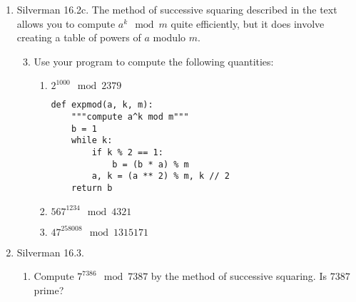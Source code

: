 \documentclass[10pt,twoside]{article}
\begin{document}
\begin{enumerate}[itemsep=2em,label=\Alph*.]
\begin{enumerate}[label=(\alph*)]
        \end{enumerate}
    \item Silverman 16.2c. The method of successive squaring described in the text allows you to compute $a^k \mod{m}$ quite efficiently, but it does involve creating a table of powers of $a$ modulo $m$.
            \begin{enumerate}[label=(\alph*)]
                \setcounter{enumii}{2}
            \item Use your program to compute the following quantities:
                \begin{enumerate}[label=(\roman*)]
                    \item $2^{1000} \mod{2379}$

                    \begin{lstlisting}
def expmod(a, k, m):
    """compute a^k mod m"""
    b = 1
    while k:
        if k % 2 == 1:
            b = (b * a) % m
        a, k = (a ** 2) % m, k // 2
    return b
    \end{lstlisting}

                    
                    \item $567^{1234} \mod{4321}$
                        
                    \item $47^{258008} \mod{1315171}$

                \end{enumerate}
        \end{enumerate}
    
    
    \item Silverman 16.3.
        \begin{enumerate}[label=(\alph*)]
            \item Compute $7^{7386} \mod{7387}$ by the method of successive squaring. Is $7387$ prime?
                

\end{enumerate}
\end{enumerate}
\end{document}

